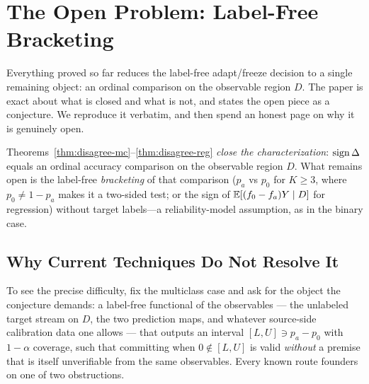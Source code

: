 \section{The Open Problem: Label-Free Bracketing}
\label{sec:t2-open}

Everything proved so far reduces the label-free adapt/freeze decision to a single
remaining object: an ordinal comparison on the observable region $D$. The paper is
exact about what is closed and what is not, and states the open piece as a conjecture.
We reproduce it verbatim, and then spend an honest page on why it is genuinely open.

\begin{conjecture}
\label{conj:gen}
Theorems~\ref{thm:disagree-mc}--\ref{thm:disagree-reg} \emph{close the characterization}:
$\operatorname{sign}\Delta$ equals an ordinal accuracy comparison on the observable region $D$. What
remains open is the label-free \emph{bracketing} of that comparison ($p_a$ vs $p_0$ for
$K\ge3$, where $p_0\neq1-p_a$ makes it a two-sided test; or the sign of
$\mathbb{E}[(f_0-f_a)Y\mid D]$ for regression) without target labels---a reliability-model
assumption, as in the binary case.
\end{conjecture}

\subsection{Why Current Techniques Do Not Resolve It}
\label{sec:t2-open-why}

To see the precise difficulty, fix the multiclass case and ask for the object the
conjecture demands: a label-free functional of the observables --- the unlabeled target
stream on $D$, the two prediction maps, and whatever source-side calibration data one
allows --- that outputs an interval $[L,U]\ni p_a-p_0$ with $1-\alpha$ coverage, such
that committing when $0\notin[L,U]$ is valid \emph{without} a premise that is itself
unverifiable from the same observables. Every known route founders on one of two
obstructions.

